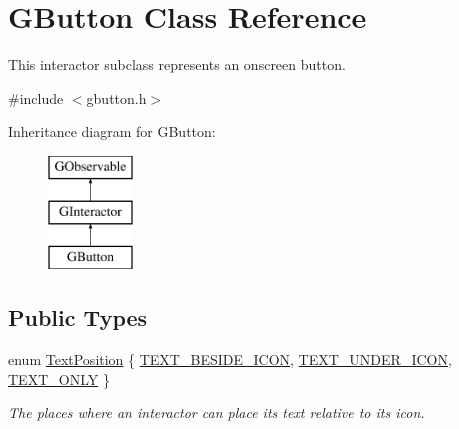 \hypertarget{classsgl_1_1GButton}{}\section{G\+Button Class Reference}
\label{classsgl_1_1GButton}


This interactor subclass represents an onscreen button.  




{\ttfamily \#include $<$gbutton.\+h$>$}

Inheritance diagram for G\+Button\+:\begin{figure}[H]
\begin{center}
\leavevmode
\includegraphics[height=3.000000cm]{classsgl_1_1GButton}
\end{center}
\end{figure}
\subsection*{Public Types}
\begin{DoxyCompactItemize}
\item 
enum \mbox{\hyperlink{classsgl_1_1GInteractor_a8e0d441725a81d2bbdebbea09078260e}{Text\+Position}} \{ \mbox{\hyperlink{classsgl_1_1GInteractor_a8e0d441725a81d2bbdebbea09078260ea4cd6f2e7d5a08d6f4dc052df2358f774}{T\+E\+X\+T\+\_\+\+B\+E\+S\+I\+D\+E\+\_\+\+I\+C\+ON}}, 
\mbox{\hyperlink{classsgl_1_1GInteractor_a8e0d441725a81d2bbdebbea09078260eaa88490f63d8de68d44c83bdb2ecde3b3}{T\+E\+X\+T\+\_\+\+U\+N\+D\+E\+R\+\_\+\+I\+C\+ON}}, 
\mbox{\hyperlink{classsgl_1_1GInteractor_a8e0d441725a81d2bbdebbea09078260ea39a6f388a30ac4fefb6eb13e846bc9f2}{T\+E\+X\+T\+\_\+\+O\+N\+LY}}
 \}
\begin{DoxyCompactList}\small\item\em The places where an interactor can place its text relative to its icon. \end{DoxyCompactList}\end{DoxyCompactItemize}
